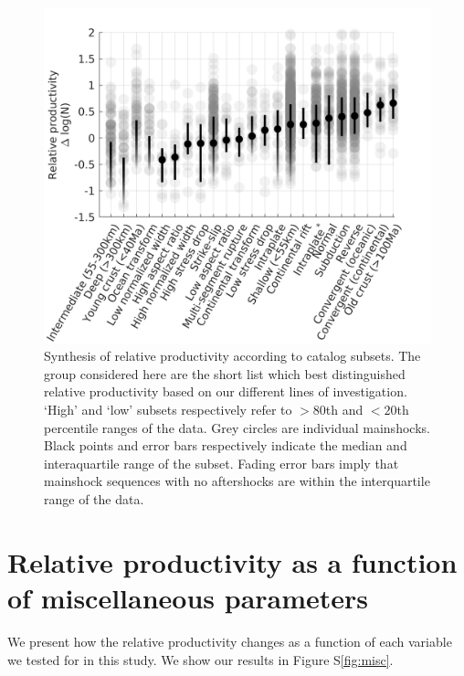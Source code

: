 \documentclass[draft]{agujournal}
\begin{document}
\begin{figure}
\centering
\label{fig:caltech}
\includegraphics{figures/cal_tech_mw5.png}
\caption{Synthesis of relative productivity according to catalog subsets. The group considered here are the short list which best distinguished relative productivity based on our different lines of investigation. `High' and `low' subsets respectively refer to $>80$th and $<20$th percentile ranges of the data. Grey circles are individual mainshocks. Black points and error bars respectively indicate the median and interaquartile range of the subset. Fading error bars imply that mainshock sequences with no aftershocks are within the interquartile range of the data.}
\end{figure}   

    
\section*{Relative productivity as a function of miscellaneous parameters}

We present how the relative productivity changes as a function of each variable we tested for in this study. We show our results in Figure S\ref{fig:misc}.
\end{document}
